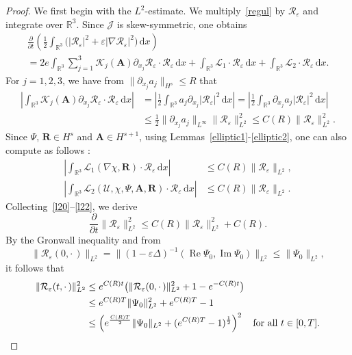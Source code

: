 \documentclass[AHL,Unicode,longabstracts]{cedram}
\newcommand{\BA}{\mathbf{A}}
\newcommand{\BR}{\mathbf{R}}
\newcommand{\R}{\mathbb{R}}
\DeclareMathOperator{\IM}{Im}
\DeclareMathOperator{\RE}{Re}
\newcommand*{\dd}{\mathrm{d}}
\newcommand*{\dx}{\dd x}
\begin{document}
\begin{proof}
We first begin with the $L^2$-estimate. We multiply~\eqref{regul} by $\mathcal{R}_\varepsilon$ and integrate over $\R^3$. Since $\mathcal{J}$ is skew-symmetric, one obtains
\begin{multline}\label{l20}
\frac{\partial}{\partial t} \left(\frac{1}{2} \int_{\R^3}
\big(| \mathcal{R}_\varepsilon|^2+\varepsilon|\nabla \mathcal{R}_\varepsilon|^2 \big)\,\dx \right)
\\
= 2e \int_{\R^3} \sum_{j=1}^3 \mathcal{K}_j(\BA) \partial_{x_j}
\mathcal{R}_\varepsilon \cdot \mathcal{R}_\varepsilon \,\dx +\int_{\R^3} \mathcal{L}_1 \cdot \mathcal{R}_\varepsilon \,\dx +\int_{\R^3} \mathcal{L}_2 \cdot \mathcal{R}_\varepsilon \,\dx.
\end{multline}
For $j=1,2,3$, we have from $\| \partial_{x_j} a_j \|_{H^s} \le R$ that
\begin{align}\label{l21}
\left| \int_{\R^3} \mathcal{K}_j(\BA) \partial_{x_j}
\mathcal{R}_\varepsilon \cdot \mathcal{R}_\varepsilon \,\dx \right| &=\left| \frac{1}{2}\int_{\R^3} a_j \partial_{x_j} |\mathcal{R}_\varepsilon |^2 \,\dx \right| =\left| \frac{1}{2}\int_{\R^3} \partial_{x_j}a_j |\mathcal{R}_\varepsilon |^2 \,\dx \right|
\nonumber \\
&\leq \frac{1}{2} \| \partial_{x_j}a_j \|_{L^\infty} \| \mathcal{R}_\varepsilon \|_{L^2}^2
\le C(R) \| \mathcal{R}_\varepsilon \|_{L^2}^2.
\end{align}
Since $\Psi$, $\BR \in H^s$ and $\BA \in H^{s+1}$, using Lemmas~\ref{elliptic1}-\ref{elliptic2}, one can also compute as follows :
\begin{align}\label{l22}
\left| \int_{\R^3} \mathcal{L}_1 (\nabla\chi, \BR) \cdot \mathcal{R}_\varepsilon \,\dx \right| & \leq C(R) \| \mathcal{R}_\varepsilon \|_{L^2}, \nonumber \\
\left| \int_{\R^3} \mathcal{L}_2 (\mathcal{U},\chi,\Psi,\BA, \BR)
\cdot \mathcal{R}_\varepsilon \,\dx \right| &\leq C(R) \| \mathcal{R}_\varepsilon \|_{L^2}.
\end{align}
Collecting~\eqref{l20}--\eqref{l22}, we derive
\[
\frac{\partial}{\partial t} \| \mathcal{R}_\varepsilon \|_{L^2}^2
\leq C(R) \| \mathcal{R}_\varepsilon \|_{L^2}^2 +C(R).
\]
By the Gronwall inequality and from
\[
\| \mathcal{R}_{\varepsilon}(0,{\cdot\,}) \|_{L^2}
= \| (1-\varepsilon \Delta)^{-1} (\RE \Psi_0,\IM\Psi_0) \|_{L^2}
\le \| \Psi_0 \|_{L^2},
\]
it follows that
\begin{align*}
\| \mathcal{R}_\varepsilon (t,{\cdot\,}) \|_{L^2}^2 & \le e^{C(R)t} \big(\| \mathcal{R}_\varepsilon (0,{\cdot\,}) \|_{L^2}^2 +1-e^{-C(R)t} \big) \\
&\le e^{C(R)T} \| \Psi_0 \|_{L^2}^2 + e^{C(R)T}-1 \\
& \le \left(e^{ \frac{C(R)T}{2}} \| \Psi_0\|_{L^2} +(e^{C(R)T}-1)^{\frac{1}{2}} \right)^2 \quad
\hbox{for all} \ t\in [0,T].
\end{align*}


\end{proof}
\end{document}
